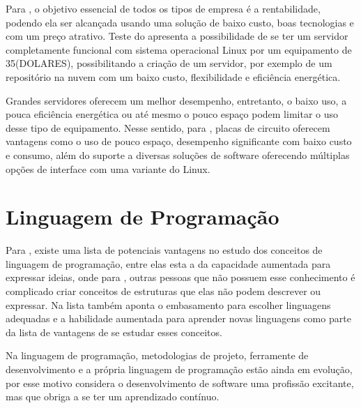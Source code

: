 Para \cite{aristotelous2016}, o objetivo essencial de todos os tipos de empresa é a rentabilidade, podendo ela ser alcançada usando uma solução de baixo custo, boas tecnologias e com um preço atrativo. Teste do \cite{aristotelous2016} apresenta a possibilidade de se ter um servidor completamente funcional com sistema operacional Linux por um equipamento de 35(DOLARES), possibilitando a criação de um servidor, por exemplo de um repositório na nuvem com um baixo custo, flexibilidade e eficiência energética. 

Grandes servidores oferecem um melhor desempenho, entretanto, o baixo uso, a pouca eficiência energética ou até mesmo o pouco espaço podem limitar o uso desse tipo de equipamento. Nesse sentido, para \cite{Cusick}, placas de circuito oferecem vantagens como o uso de pouco espaço, desempenho significante com baixo custo e consumo, além do suporte a diversas soluções de software oferecendo múltiplas opções de interface com uma variante do Linux. 

\section{Linguagem de Programação}
Para \cite{sebesta2011}, existe uma lista de potenciais vantagens no estudo dos conceitos de linguagem de programação, entre elas esta a da capacidade aumentada para expressar ideias, onde para \cite{sebesta2011}, outras pessoas que não possuem esse conhecimento é complicado criar conceitos de estruturas que elas não podem descrever ou expressar. Na lista também aponta o embasamento para escolher linguagens adequadas e a habilidade aumentada para aprender novas linguagens como parte da lista de vantagens de se estudar esses conceitos.

Na linguagem de programação, metodologias de projeto, ferramente de desenvolvimento e a própria linguagem de programação estão ainda em evolução, por esse motivo \cite{sebesta2011} considera o desenvolvimento de software uma profissão excitante, mas que obriga a se ter um aprendizado contínuo.

%


%
